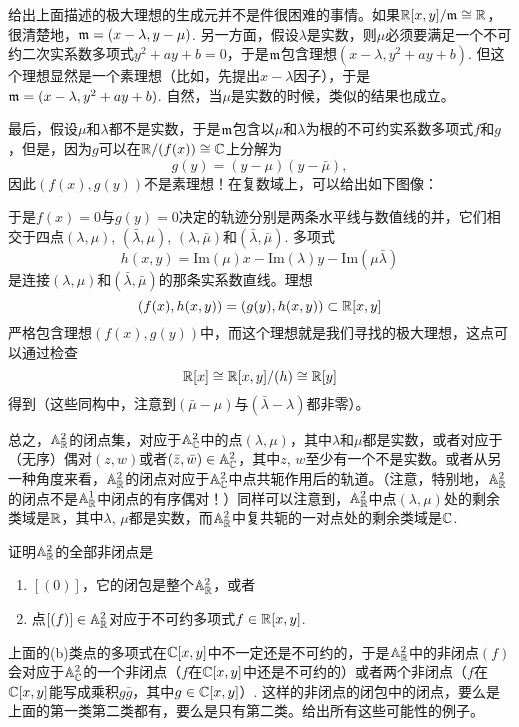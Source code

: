 给出上面描述的极大理想的生成元并不是件很困难的事情。如果$\mathbb{R}[x,y]/\mathfrak{m}\cong \mathbb{R} $，很清楚地，$\mathfrak{m}=(x-\lambda,y-\mu)$. 另一方面，假设$\lambda$是实数，则$\mu$必须要满足一个不可约二次实系数多项式$y^2+ay+b=0$，于是$\mathfrak{m}$包含理想$(x-\lambda,y^2+ay+b)$. 但这个理想显然是一个素理想（比如，先提出$x-\lambda$因子），于是$\mathfrak{m}=(x-\lambda,y^2+ay+b)$. 自然，当$\mu$是实数的时候，类似的结果也成立。

最后，假设$\mu$和$\lambda$都不是实数，于是$\mathfrak{m}$包含以$\mu$和$\lambda$为根的不可约实系数多项式$f$和$g$，但是，因为$g$可以在$\mathbb{R}/(f(x))\cong \mathbb{C}$上分解为
\[
	g(y)=(y-\mu)(y-\bar\mu),
\]
因此$(f(x),g(y))$不是素理想！在复数域上，可以给出如下图像：


于是$f(x)=0$与$g(y)=0$决定的轨迹分别是两条水平线与数值线的并，它们相交于四点$(\lambda,\mu)$, $(\bar\lambda,\mu)$, $(\lambda,\bar\mu)$和$(\bar\lambda,\bar\mu)$. 多项式
\[
	h(x,y)=\mathrm{Im}(\mu) x - \mathrm{Im}(\lambda)  y -\mathrm{Im}(\mu\bar\lambda)
\]
是连接$(\lambda,\mu)$和$(\bar\lambda,\bar\mu)$的那条实系数直线。理想
\[
	(f(x),h(x,y))=(g(y),h(x,y))\subset \mathbb{R}[x,y]
\]
严格包含理想$(f(x),g(y))$中，而这个理想就是我们寻找的极大理想，这点可以通过检查
\[
	\mathbb{R}[x]\cong \mathbb{R}[x,y]/(h)\cong \mathbb{R}[y]
\]
得到（这些同构中，注意到$(\bar\mu-\mu)$与$(\bar\lambda-\lambda)$都非零）。

总之，$\mathbb{A}_{\mathbb{R}}^2$的闭点集，对应于$\mathbb{A}_{\mathbb{C}}^2$中的点$(\lambda,\mu)$，其中$\lambda$和$\mu$都是实数，或者对应于（无序）偶对$(z,w)$或者$(\bar z,\bar w)\in \mathbb{A}_{\mathbb{C}}^2$，其中$z$, $w$至少有一个不是实数。或者从另一种角度来看，$\mathbb{A}_{\mathbb{R}}^2$的闭点对应于$\mathbb{A}_{\mathbb{C}}^2$中点共轭作用后的轨道。（注意，特别地，$\mathbb{A}_{\mathbb{R}}^2$的闭点不是$\mathbb{A}_{\mathbb{R}}^1$中闭点的有序偶对！）同样可以注意到，$\mathbb{A}_{\mathbb{R}}^2$中点$(\lambda,\mu)$处的剩余类域是$\mathbb{R}$，其中$\lambda$, $\mu$都是实数，而$\mathbb{A}_{\mathbb{R}}^2$中复共轭的一对点处的剩余类域是$\mathbb{C}$.

\begin{exe}
	证明$\mathbb{A}^2_{\mathbb{R}}$的全部非闭点是
	\begin{enumerate}[{(a)}]\setlength{\itemsep}{0pt}
		\item $[(0)]$，它的闭包是整个$\mathbb{A}^2_{\mathbb{R}}$，或者
		\item 点$[(f)]\in \mathbb{A}^2_{\mathbb{R}}$对应于不可约多项式$f\in \mathbb{R}[x,y]$.
	\end{enumerate}

	上面的(b)类点的多项式在$\mathbb{C}[x,y]$中不一定还是不可约的，于是$\mathbb{A}^2_{\mathbb{R}}$中的非闭点$(f)$会对应于$\mathbb{A}^2_{\mathbb{C}}$的一个非闭点（$f$在$\mathbb{C}[x,y]$中还是不可约的）或者两个非闭点（$f$在$\mathbb{C}[x,y]$能写成乘积$g\bar g$，其中$g\in\mathbb{C}[x,y]$）. 这样的非闭点的闭包中的闭点，要么是上面的第一类第二类都有，要么是只有第二类。给出所有这些可能性的例子。
\end{exe}

